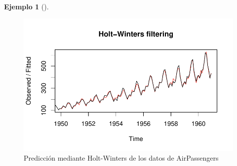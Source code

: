 \documentclass[
  us-letterpaper,
]{scrreprt}
\theoremstyle{plain}
\theoremstyle{definition}
\newtheorem{example}{Ejemplo}[chapter]
\theoremstyle{plain}
\theoremstyle{definition}
\theoremstyle{remark}
\begin{document}
\begin{example}[]
\begin{tcolorbox}
\begin{figure}[H]
\begin{minipage}{0.50\linewidth}
{\includegraphics{series_files/figure-pdf/fig-HWAP-1.pdf}

}


\end{minipage}%
%
\begin{minipage}{0.50\linewidth}



\end{minipage}%

\caption{\label{fig-HWAP}Predicción mediante Holt-Winters de los datos
de AirPassengers}

\end{figure}%

\end{tcolorbox}

\end{example}
\end{document}

